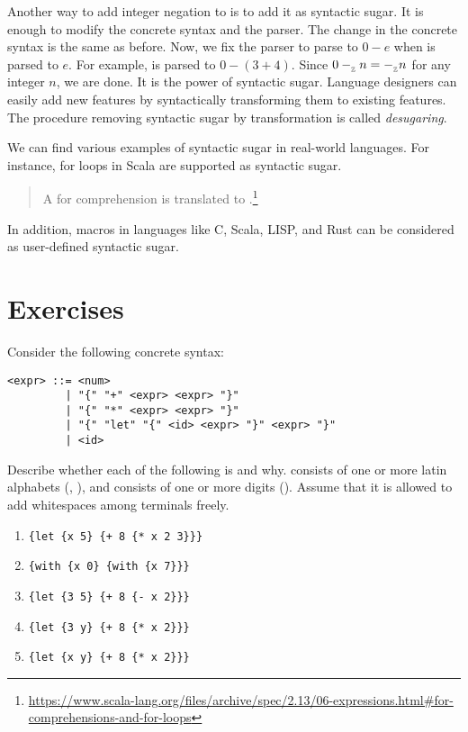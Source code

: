 Another way to add integer negation to \Lang is to add it as syntactic sugar. It
is enough to modify the concrete syntax and the parser. The change in the
concrete syntax is the same as before. Now, we fix the parser to parse  to $0-e$ when  is parsed to $e$. For example,
 is parsed to $0-(3+4)$. Since $0-_{{}_{\mathbb{Z}}} n=-_{{}_{\mathbb{Z}}} n$ for any integer
$n$, we are done. It is the power of syntactic sugar. Language designers can
easily add new features by syntactically transforming them to existing features.
The procedure removing syntactic sugar by transformation is called
\textit{desugaring}.

We can find various examples of syntactic sugar in real-world languages. For
instance, for loops in Scala are supported as syntactic sugar.

\begin{quote}
  A for comprehension  is translated to
  .\footnote{\url{https://www.scala-lang.org/files/archive/spec/2.13/06-expressions.html\#for-comprehensions-and-for-loops}}
\end{quote}

In addition, macros in languages like C, Scala, LISP, and Rust can be considered
as user-defined syntactic sugar.

\section{Exercises}

\begin{exercise}

Consider the following concrete syntax:

\begin{verbatim}
<expr> ::= <num>
         | "{" "+" <expr> <expr> "}"
         | "{" "*" <expr> <expr> "}"
         | "{" "let" "{" <id> <expr> "}" <expr> "}"
         | <id>
\end{verbatim}

Describe whether each of the following is  and why.
 consists of one or more latin alphabets (, ), and
 consists of one or more digits ().
Assume that it is allowed to add whitespaces among terminals freely.

\begin{enumerate}
  \item \verb!{let {x 5} {+ 8 {* x 2 3}}}!
  \item \verb!{with {x 0} {with {x 7}}}!
  \item \verb!{let {3 5} {+ 8 {- x 2}}}!
  \item \verb!{let {3 y} {+ 8 {* x 2}}}!
  \item \verb!{let {x y} {+ 8 {* x 2}}}!
\end{enumerate}

\end{exercise}

